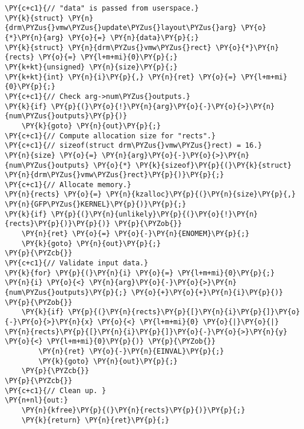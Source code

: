 \begin{Verbatim}[commandchars=\\\{\},fontsize=\footnotesize]
\PY{c+c1}{// "data" is passed from userspace.}
\PY{k}{struct} \PY{n}{drm\PYZus{}vmw\PYZus{}update\PYZus{}layout\PYZus{}arg} \PY{o}{*}\PY{n}{arg} \PY{o}{=} \PY{n}{data}\PY{p}{;}
\PY{k}{struct} \PY{n}{drm\PYZus{}vmw\PYZus{}rect} \PY{o}{*}\PY{n}{rects} \PY{o}{=} \PY{l+m+mi}{0}\PY{p}{;}
\PY{k+kt}{unsigned} \PY{n}{size}\PY{p}{;}
\PY{k+kt}{int} \PY{n}{i}\PY{p}{,} \PY{n}{ret} \PY{o}{=} \PY{l+m+mi}{0}\PY{p}{;}
\PY{c+c1}{// Check arg->num\PYZus{}outputs.}
\PY{k}{if} \PY{p}{(}\PY{o}{!}\PY{n}{arg}\PY{o}{-}\PY{o}{>}\PY{n}{num\PYZus{}outputs}\PY{p}{)}
	\PY{k}{goto} \PY{n}{out}\PY{p}{;}
\PY{c+c1}{// Compute allocation size for "rects".}
\PY{c+c1}{// sizeof(struct drm\PYZus{}vmw\PYZus{}rect) = 16.}
\PY{n}{size} \PY{o}{=} \PY{n}{arg}\PY{o}{-}\PY{o}{>}\PY{n}{num\PYZus{}outputs} \PY{o}{*} \PY{k}{sizeof}\PY{p}{(}\PY{k}{struct} \PY{n}{drm\PYZus{}vmw\PYZus{}rect}\PY{p}{)}\PY{p}{;}
\PY{c+c1}{// Allocate memory.}
\PY{n}{rects} \PY{o}{=} \PY{n}{kzalloc}\PY{p}{(}\PY{n}{size}\PY{p}{,} \PY{n}{GFP\PYZus{}KERNEL}\PY{p}{)}\PY{p}{;}
\PY{k}{if} \PY{p}{(}\PY{n}{unlikely}\PY{p}{(}\PY{o}{!}\PY{n}{rects}\PY{p}{)}\PY{p}{)} \PY{p}{\PYZob{}}
	\PY{n}{ret} \PY{o}{=} \PY{o}{-}\PY{n}{ENOMEM}\PY{p}{;}
	\PY{k}{goto} \PY{n}{out}\PY{p}{;}
\PY{p}{\PYZcb{}}
\PY{c+c1}{// Validate input data.}
\PY{k}{for} \PY{p}{(}\PY{n}{i} \PY{o}{=} \PY{l+m+mi}{0}\PY{p}{;} \PY{n}{i} \PY{o}{<} \PY{n}{arg}\PY{o}{-}\PY{o}{>}\PY{n}{num\PYZus{}outputs}\PY{p}{;} \PY{o}{+}\PY{o}{+}\PY{n}{i}\PY{p}{)} \PY{p}{\PYZob{}}
	\PY{k}{if} \PY{p}{(}\PY{n}{rects}\PY{p}{[}\PY{n}{i}\PY{p}{]}\PY{o}{-}\PY{o}{>}\PY{n}{x} \PY{o}{<} \PY{l+m+mi}{0} \PY{o}{|}\PY{o}{|} \PY{n}{rects}\PY{p}{[}\PY{n}{i}\PY{p}{]}\PY{o}{-}\PY{o}{>}\PY{n}{y} \PY{o}{<} \PY{l+m+mi}{0}\PY{p}{)} \PY{p}{\PYZob{}}
		\PY{n}{ret} \PY{o}{-}\PY{n}{EINVAL}\PY{p}{;}
		\PY{k}{goto} \PY{n}{out}\PY{p}{;}
	\PY{p}{\PYZcb{}}
\PY{p}{\PYZcb{}}
\PY{c+c1}{// Clean up. }
\PY{n+nl}{out:}
	\PY{n}{kfree}\PY{p}{(}\PY{n}{rects}\PY{p}{)}\PY{p}{;}
	\PY{k}{return} \PY{n}{ret}\PY{p}{;}
\end{Verbatim}
